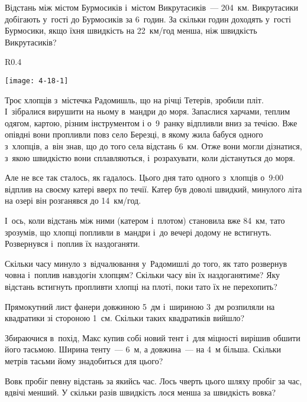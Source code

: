 \problem
Відстань між містом Бурмосиків і~містом Викрутасиків~--- 204~км.
Викрутасики добігають у~гості до Бурмосиків за 6~годин.
За скільки годин доходять у~гості Бурмосики,
якщо їхня швидкість на 22~км/год менша, ніж швидкість Викрутасиків?


\problem
{}

\begin{wrapfigure}{R}{0.4\textwidth}
  \vspace{-15pt}
  \begin{center}
    \texttt{[image: 4-18-1]}
  \end{center}
  \vspace{-15pt}
\end{wrapfigure}

Троє хлопців з~містечка Радомишль, що на річці Тетерів, зробили пліт.
І~зібралися вирушити на ньому в~мандри до моря. Запаслися харчами,
теплим одягом, картою, різним інструментом і о~9~ранку відпливли вниз
за течією. Вже опівдні вони пропливли повз село Березці, в якому жила
бабуся одного з~хлопців, а~він знав, що до того села відстань 6~км.
Отже вони могли дізнатися, з~якою швидкістю вони сплавляються,
і~розрахувати, коли дістануться до моря.

Але не все так сталось, як гадалось. Цього дня тато одного з~хлопців
о~9:00 відплив на своєму катері вверх по течії. Катер був доволі швидкий,
минулого літа на озері він розганявся до 14~км/год.

І~ось, коли відстань між ними (катером і~плотом) становила вже 84~км,
тато зрозумів, що хлопці попливли в~мандри і~до вечері додому не встигнуть.
Розвернувся і~поплив їх наздоганяти.

Скільки часу минуло з~відчалювання у~Радомишлі до того, як тато
розвернув човна і~поплив навздогін хлопцям?
Скільки часу він їх наздоганятиме?
Яку відстань встигнуть пропливти хлопці на плоті, поки тато їх не перехопить?


\problem
Прямокутний лист фанери довжиною 5~дм і~шириною 3~дм розпиляли на квадратики
зі стороною 1~см.
Скільки таких квадратиків вийшло?


\problem
Збираючися в~похід, Макс купив собі новий тент і~для міцності вирішив
обшити його тасьмою. Ширина тенту~--- 6~м, а довжина~--- на 4~м більша.
Скільки метрів тасьми йому знадобиться для цього?


\problem
Вовк пробіг певну відстань за якийсь час.
Лось чверть цього шляху пробіг за час, вдвічі менший.
У скільки разів швидкість лося менша за швидкість вовка?


